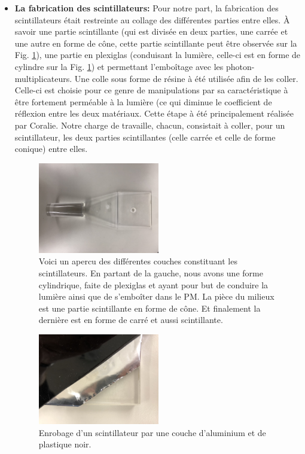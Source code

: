\documentclass[12pt]{article}
\begin{document}
\begin{itemize}
    \item \textbf{La fabrication des scintillateurs: } Pour notre part, la fabrication des scintillateurs était restreinte au collage des différentes parties entre elles. À savoir une partie scintillante (qui est divisée en deux parties, une carrée et une autre en forme de cône, cette partie scintillante peut être observée sur la Fig. \ref{scintilateur}),  une partie en plexiglas (conduisant la lumière, celle-ci est en forme de cylindre sur la Fig. \ref{scintilateur}) et permettant l'emboîtage avec les photon-multiplicateurs. Une colle sous forme de résine à été utilisée afin de les coller. Celle-ci est choisie pour ce genre de manipulations par sa caractéristique à être fortement perméable à la lumière (ce qui diminue le coefficient de réflexion entre les deux matériaux. Cette étape à été principalement réalisée par Coralie. Notre charge de travaille, chacun, consistait à coller, pour un scintillateur, les deux parties scintillantes (celle carrée et celle de forme conique) entre elles. 
    
\begin{figure}[htpb!]
        \centering
            \includegraphics[width=0.5\textwidth]{Images/Photos/scintilateur.jpg}
            \caption{Voici un apercu des différentes couches constituant les scintillateurs. En partant de la gauche, nous avons une forme cylindrique, faite de plexiglas et ayant pour but de conduire la lumière ainsi que de s'emboîter dans le PM. La pièce du milieux est une partie scintillante en forme de cône. Et finalement la dernière est en forme de carré et aussi scintillante.}
            \label{scintilateur}
\end{figure}


\begin{figure}[htpb!]
        \centering
            \includegraphics[width=0.5\textwidth]{Images/Photos/couche_scintilateur.jpg}
            \caption{Enrobage d'un scintillateur par une couche d'aluminium et de plastique noir.}
            \label{couche_scintilateur}
\end{figure}


\end{itemize}
\end{document}
